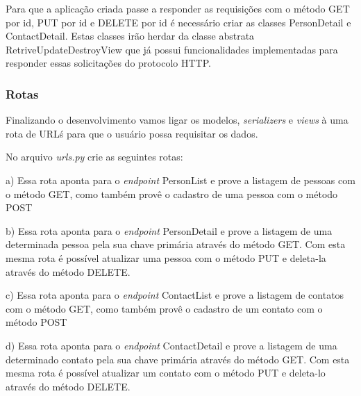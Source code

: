   Para que a aplicação criada passe a responder as requisições com o método GET por id, PUT por id e DELETE por id é necessário criar
  as classes PersonDetail e ContactDetail. Estas classes irão herdar da classe abstrata RetriveUpdateDestroyView que já possui 
  funcionalidades implementadas para responder essas solicitações do protocolo \ac{HTTP}.

\subsubsection{Rotas}

  Finalizando o desenvolvimento vamos ligar os modelos, \textit{serializers} e \textit{views} à uma rota de URL\'s para que o usuário
  possa requisitar os dados.
  
  No arquivo \textit{urls.py} crie as seguintes rotas:
  
  \begin{compactitem}
    \item[a)] 
    Essa rota aponta para o \textit{endpoint} PersonList e prove a listagem de pessoas com o método GET, como também
    provê o cadastro de uma pessoa com o método POST
    
    \item[b)] 
    Essa rota aponta para o \textit{endpoint} PersonDetail e prove a listagem de uma determinada pessoa pela sua chave primária
    através do método GET. Com esta mesma rota é possível atualizar uma pessoa com o método PUT e deleta-la através do 
    método DELETE.
        
    \item[c)] 
    Essa rota aponta para o \textit{endpoint} ContactList e prove a listagem de contatos com o método GET, como também
    provê o cadastro de um contato com o método POST
    
    \item[d)] 
    Essa rota aponta para o \textit{endpoint} ContactDetail e prove a listagem de uma determinado contato pela sua chave primária
    através do método GET. Com esta mesma rota é possível atualizar um contato com o método PUT e deleta-lo através do 
    método DELETE.
        
  \end{compactitem}
  

